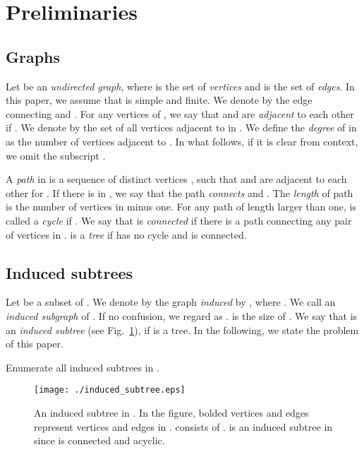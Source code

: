 \documentclass{llncs}
\newcommand{\name}[1]{\textit{#1}}
\begin{document}
\section{Preliminaries}
\label{sec:prelim}

\subsection{Graphs}

Let  be an \name{undirected graph}, 
where  is the set of \name{vertices} and  is the set of \name{edges}. 
In this paper, we assume that  is simple and finite. 
We denote by  the edge connecting  and . 
For any vertices  of , 
we say that  and  are \name{adjacent} to each other if .  
We denote by  the set of all vertices adjacent to  in . 
We define the \name{degree}  of  in  as the number of vertices adjacent to . 
In what follows,
if it is clear from context, 
we omit the subscript . 

A \name{path} in  is 
a sequence of distinct vertices , 
such that  and  are adjacent to each other for . 
If there is  in , 
we say that the path \name{connects}  and . 
The \name{length} of path  is the number of vertices in  minus one. 
For any path  of length larger than one, 
 is called a \name{cycle} if . 
We say that  is \name{connected} 
if there is a path connecting any pair of vertices in . 
 is a \name{tree} if  has no cycle and is connected. 


\subsection{Induced subtrees}

Let  be a subset of . 
We denote by  the graph \name{induced} by , 
where . 
We call  an \name{induced subgraph} of . 
If no confusion, we regard  as .
 is the size of . 
We say that  is an \name{induced subtree} (see Fig.~\ref{img:induced:subtree}),  
if  is a tree.  
In the following, we state the problem of this paper. 

\begin{wproblem}
    \label{prob:main}
    Enumerate all induced subtrees in  . 
\end{wproblem}



\begin{figure}[t]
    \begin{center}
        \texttt{[image: ./induced\_subtree.eps]}
        \caption{
            An induced subtree  in . 
            In the figure, bolded vertices and edges represent vertices and edges in . 
             consists of . 
             is an induced subtree in  since  is connected and acyclic. 
        }
        \label{img:induced:subtree}
    \end{center}
\end{figure}
\end{document}
